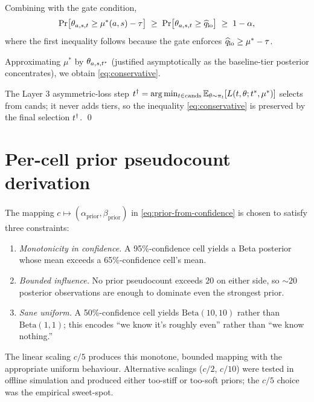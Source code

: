 Combining with the gate condition,
\[
  \Pr\!\big[
    \theta_{a,s,t}
      \geq \mu^*(a, s) - \tau
  \big]
  \;\geq\;
  \Pr\!\big[
    \theta_{a,s,t} \geq \widehat{q}_{\mathrm{lo}}
  \big]
  \;\geq\; 1 - \alpha,
\]
where the first inequality follows because the gate enforces
$\widehat{q}_{\mathrm{lo}} \geq \mu^* - \tau$.

Approximating $\mu^*$ by $\theta_{a,s,t^*}$ (justified
asymptotically as the baseline-tier posterior concentrates), we obtain
\cref{eq:conservative}.

The Layer 3 asymmetric-loss step
\(
  t^\dagger = \arg\min_{t \in \mathrm{cands}}
    \mathbb{E}_{\theta \sim \pi_{t}}
      [L(t, \theta; t^*, \mu^*)]
\)
selects from $\mathrm{cands}$; it never adds tiers, so the inequality
\cref{eq:conservative} is preserved by the final selection
$t^\dagger$. \qed

\section{Per-cell prior pseudocount derivation}
\label{app:prior}

The mapping
\(
  c \mapsto (\alpha_{\mathrm{prior}}, \beta_{\mathrm{prior}})
\)
in \cref{eq:prior-from-confidence} is chosen to satisfy three constraints:

\begin{enumerate}[leftmargin=*]
  \item \emph{Monotonicity in confidence.} A 95\%-confidence cell yields a
        Beta posterior whose mean exceeds a 65\%-confidence cell's mean.
  \item \emph{Bounded influence.} No prior pseudocount exceeds $20$ on
        either side, so $\sim 20$ posterior observations are enough to
        dominate even the strongest prior.
  \item \emph{Sane uniform.} A 50\%-confidence cell yields
        $\mathrm{Beta}(10, 10)$ rather than $\mathrm{Beta}(1, 1)$; this
        encodes ``we know it's roughly even'' rather than ``we know
        nothing.''
\end{enumerate}

The linear scaling $c / 5$ produces this monotone, bounded mapping with
the appropriate uniform behaviour. Alternative scalings ($c / 2$, $c / 10$)
were tested in offline simulation and produced either too-stiff or too-soft
priors; the $c / 5$ choice was the empirical sweet-spot.

